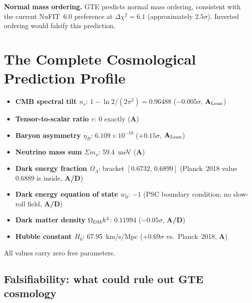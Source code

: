 \documentclass[11pt,a4paper]{article}
\newcommand{\CatAL}{\ensuremath{\mathbf{A}_{\rm Lean}}}
\newcommand{\CatAD}{\textbf{A/D}}
\newcommand{\CatA}{\textbf{A}}
\newcommand{\ns}{n_s}
\newcommand{\OmL}{\Omega_\Lambda}
\newcommand{\etaB}{\eta_B}
\begin{document}
\textbf{Normal mass ordering.}
GTE predicts normal mass ordering, consistent with the current NuFIT~6.0
preference at $\Delta\chi^2 = 6.1$ (approximately $2.5\sigma$).
Inverted ordering would falsify this prediction.

\section{The Complete Cosmological Prediction Profile}
\label{sec:summary}

\begin{tcolorbox}[colback=boxpurple,colframe=blue!40!black,
  title={GTE cosmological predictions summary},breakable]
\begin{itemize}[itemsep=3pt]
  \item \textbf{CMB spectral tilt $\ns$}: $1 - \ln2/(2\pi^2) = 0.96488$
        ($-0.005\sigma$, \CatAL)
  \item \textbf{Tensor-to-scalar ratio $r$}: $0$ exactly (\CatA)
  \item \textbf{Baryon asymmetry $\etaB$}: $6.109 \times 10^{-10}$
        ($+0.15\sigma$, \CatAL)
  \item \textbf{Neutrino mass sum $\Sigma m_\nu$}: 59.4~meV (\CatA)
  \item \textbf{Dark energy fraction $\OmL$}: bracket $[0.6732,\,0.6899]$
        (Planck~2018 value $0.6889$ is inside, \CatAD)
  \item \textbf{Dark energy equation of state $w_0$}: $-1$ (PSC boundary
        condition; no slow-roll field, \CatAD)
  \item \textbf{Dark matter density $\Omega_{\rm DM}h^2$}: $0.11994$
        ($-0.05\sigma$, \CatAD)
  \item \textbf{Hubble constant $H_0$}: 67.95~km/s/Mpc
        ($+0.69\sigma$ vs.\ Planck~2018, \CatA)
\end{itemize}
All values carry zero free parameters.
\end{tcolorbox}

\subsection{Falsifiability: what could rule out GTE cosmology}
\end{document}
